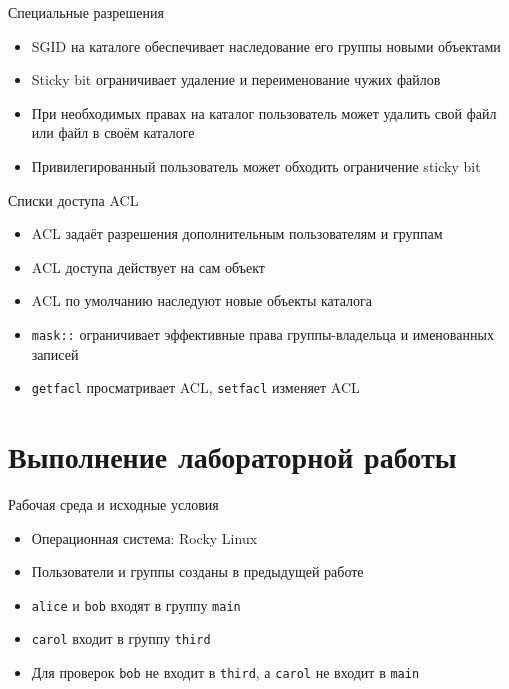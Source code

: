 \documentclass[
  ignorenonframetext,
  aspectratio=169,
  russian,
]{beamer}
\providecommand{\tightlist}{%
  \setlength{\itemsep}{0pt}\setlength{\parskip}{0pt}}
\begin{document}
\begin{frame}{Специальные разрешения}
\protect{}\label{ux441ux43fux435ux446ux438ux430ux43bux44cux43dux44bux435-ux440ux430ux437ux440ux435ux448ux435ux43dux438ux44f}
\begin{itemize}
\tightlist
\item
  SGID на каталоге обеспечивает наследование его группы новыми объектами
\item
  Sticky bit ограничивает удаление и переименование чужих файлов
\item
  При необходимых правах на каталог пользователь может удалить свой файл
  или файл в своём каталоге
\item
  Привилегированный пользователь может обходить ограничение sticky bit
\end{itemize}
\end{frame}

\begin{frame}[fragile]{Списки доступа ACL}
\protect{}\label{ux441ux43fux438ux441ux43aux438-ux434ux43eux441ux442ux443ux43fux430-acl}
\begin{itemize}
\tightlist
\item
  ACL задаёт разрешения дополнительным пользователям и группам
\item
  ACL доступа действует на сам объект
\item
  ACL по умолчанию наследуют новые объекты каталога
\item
  \texttt{mask::} ограничивает эффективные права группы-владельца и
  именованных записей
\item
  \texttt{getfacl} просматривает ACL, \texttt{setfacl} изменяет ACL
\end{itemize}
\end{frame}

\section{Выполнение лабораторной
работы}\label{ux432ux44bux43fux43eux43bux43dux435ux43dux438ux435-ux43bux430ux431ux43eux440ux430ux442ux43eux440ux43dux43eux439-ux440ux430ux431ux43eux442ux44b}

\begin{frame}[fragile]{Рабочая среда и исходные условия}
\protect{}\label{ux440ux430ux431ux43eux447ux430ux44f-ux441ux440ux435ux434ux430-ux438-ux438ux441ux445ux43eux434ux43dux44bux435-ux443ux441ux43bux43eux432ux438ux44f}
\begin{itemize}
\tightlist
\item
  Операционная система: Rocky Linux
\item
  Пользователи и группы созданы в предыдущей работе
\item
  \texttt{alice} и \texttt{bob} входят в группу \texttt{main}
\item
  \texttt{carol} входит в группу \texttt{third}
\item
  Для проверок \texttt{bob} не входит в \texttt{third}, а \texttt{carol}
  не входит в \texttt{main}
\end{itemize}
\end{frame}
\end{document}
